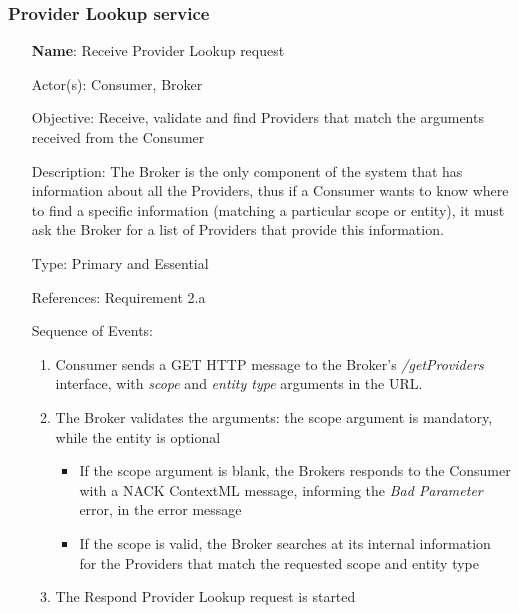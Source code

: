 \subsubsection{Provider Lookup service}
\begin{itemize}
	\item[\textbf{Name}:] Receive Provider Lookup request
	\item[Actor(s):] Consumer, Broker
	\item[Objective:] Receive, validate and find Providers that match the arguments received from the Consumer
	\item[Description:] The Broker is the only component of the system that has information about all the Providers, thus if a Consumer wants to know where to find a specific information (matching a particular scope or entity), it must ask the Broker for a list of Providers that provide this information.
	\item[Type:] Primary and Essential
	\item[References:] Requirement 2.a 
	\item[Sequence of Events:]\hfill
	\begin{enumerate}
		\item Consumer sends a GET HTTP message to the Broker's \textit{/getProviders} interface, with \textit{scope} and \textit{entity type} arguments in the URL.
		\item The Broker validates the arguments: the scope argument is mandatory, while the entity is optional
		\begin{itemize}
			\item If the scope argument is blank, the Brokers responds to the Consumer with a NACK ContextML message, informing the \textit{Bad Parameter} error, in the error message
			\item If the scope is valid, the Broker searches at its internal information for the Providers that match the requested scope and entity type
		\end{itemize}
		\item The Respond Provider Lookup request is started
	\end{enumerate}
\end{itemize}

